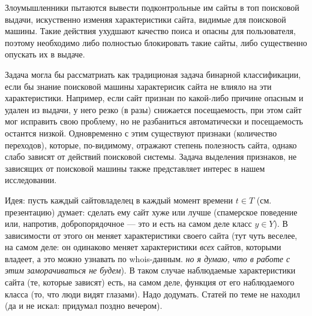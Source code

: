 



Злоумышленники пытаются вывести подконтрольные им сайты в топ поисковой выдачи, искуственно изменяя характеристики сайта, видимые для поисковой машины. Такие действия ухудшают качество поиса и опасны для пользователя, поэтому необходимо либо полностью блокировать такие сайты, либо существенно опускать их в выдаче.

Задача могла бы рассматриать как традиционая задача бинарной классификации, если бы знание поисковой машины характерисик сайта не влияло на эти характеристики. Например, если сайт признан по какой-либо причине опасным и удален из выдачи, у него резко (в разы) снижается посещаемость, при этом сайт мог исправить свою проблему, но не разбаниться автоматически и посещаемость остантся низкой. Одновременно с этим существуют признаки (количество переходов), которые, по-видимому, отражают степень полезность сайта, однако слабо зависят от действий поисковой системы. Задача выделения признаков, не зависящих от поисковой машины также представляет интерес в нашем исследовании.

Идея: пусть каждый сайтовладелец в каждый момент времени $t\in T$ (см. презентацию) думает: сделать ему сайт хуже или лучше (спамерское поведение или, напротив, добропорядочное --- это и есть на самом деле класс $y\in Y$). В зависимости от этого он меняет характеристики своего сайта (тут чуть веселее, на самом деле: он одинаково меняет характеристики {\it всех} сайтов, которыми владеет, а это можно узнавать по whois-данным. {\it но я думаю, что в работе с этим заморачиваться не будем}). В таком случае наблюдаемые характеристики сайта (те, которые зависят) есть, на самом деле, функция от его наблюдаемого класса (то, что люди видят глазами). Надо додумать. Статей по теме не находил (да и не искал: придумал поздно вечером).
